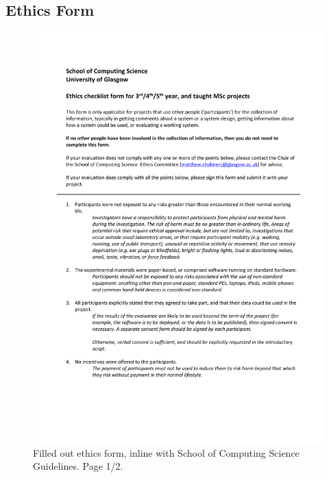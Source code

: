 \documentclass{l4proj}
\begin{document}
\begin{appendices}
\subsection{Ethics Form} \label{appendix:ethics}
\begin{figure}[htbp]
    \centering
    \includegraphics[page=1,width=0.8\linewidth]{dissertation/images/Ethics.pdf}   
    \caption{Filled out ethics form, inline with School of Computing Science Guidelines. Page 1/2.}
\end{figure}
\newpage
\begin{figure}[htbp]
    \centering

\end{figure}
\end{appendices}
\end{document}
